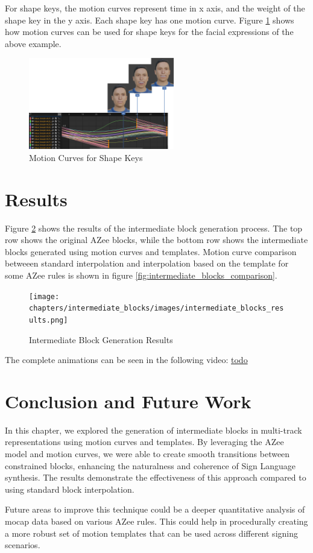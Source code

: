 \documentclass[../../main.tex]{subfiles}
\begin{document}
For shape keys, the motion curves represent time in x axis, and the weight of the shape key in the y axis. Each shape key has one motion curve. Figure \ref{fig:motion_curves_shape_keys} shows how motion curves can be used for shape keys for the facial expressions of the above example.

\begin{figure}
    \centering \includegraphics[width = 2.5in]{chapters/intermediate_blocks/images/motion_curves_shape_keys.png}
    \caption{Motion Curves for Shape Keys}
    \label{fig:motion_curves_shape_keys}
\end{figure}

\section{Results}
\label{ch:intermediate_blocks:results}

Figure \ref{fig:intermediate_blocks_results} shows the results of the intermediate block generation process. The top row shows the original AZee blocks, while the bottom row shows the intermediate blocks generated using motion curves and templates. Motion curve comparison betweeen standard interpolation and interpolation based on the template for some AZee rules is shown in figure \ref{fig:intermediate_blocks_comparison}.

\begin{figure}
    \centering \texttt{[image: chapters/intermediate\_blocks/images/intermediate\_blocks\_results.png]}
    \caption{Intermediate Block Generation Results}
    \label{fig:intermediate_blocks_results}
\end{figure}

The complete animations can be seen in the following video: \url{todo}

\section{Conclusion and Future Work}
\label{ch:intermediate_blocks:conclusion_and_future_work}

In this chapter, we explored the generation of intermediate blocks in multi-track representations using motion curves and templates. By leveraging the AZee model and motion curves, we were able to create smooth transitions between constrained blocks, enhancing the naturalness and coherence of Sign Language synthesis. The results demonstrate the effectiveness of this approach compared to using standard block interpolation. 

Future areas to improve this technique could be a deeper quantitative analysis of mocap data based on various AZee rules. This could help in procedurally creating a more robust set of motion templates that can be used across different signing scenarios.
\end{document}
